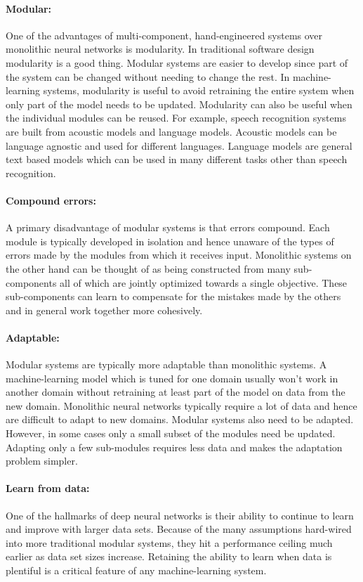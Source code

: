 \paragraph{Modular:} One of the advantages of multi-component, hand-engineered
systems over monolithic neural networks is modularity. In traditional software
design modularity is a good thing. Modular systems are easier to develop since
part of the system can be changed without needing to change the rest. In
machine-learning systems, modularity is useful to avoid retraining the entire
system when only part of the model needs to be updated. Modularity can also be
useful when the individual modules can be reused. For example, speech
recognition systems are built from acoustic models and language models.
Acoustic models can be language agnostic and used for different languages.
Language models are general text based models which can be used in many
different tasks other than speech recognition.

\paragraph{Compound errors:} A primary disadvantage of modular systems is that
errors compound. Each module is typically developed in isolation and hence
unaware of the types of errors made by the modules from which it receives
input. Monolithic systems on the other hand can be thought of as being
constructed from many sub-components all of which are jointly optimized towards
a single objective. These sub-components can learn to compensate for the
mistakes made by the others and in general work together more cohesively.

\paragraph{Adaptable:} Modular systems are typically more adaptable than
monolithic systems. A machine-learning model which is tuned for one domain
usually won't work in another domain without retraining at least part of the
model on data from the new domain. Monolithic neural networks typically require
a lot of data and hence are difficult to adapt to new domains. Modular systems
also need to be adapted. However, in some cases only a small subset of the
modules need be updated. Adapting only a few sub-modules requires less data and
makes the adaptation problem simpler.

\paragraph{Learn from data:} One of the hallmarks of deep neural networks is
their ability to continue to learn and improve with larger data sets. Because
of the many assumptions hard-wired into more traditional modular systems, they
hit a performance ceiling much earlier as data set sizes increase. Retaining
the ability to learn when data is plentiful is a critical feature of any
machine-learning system.

